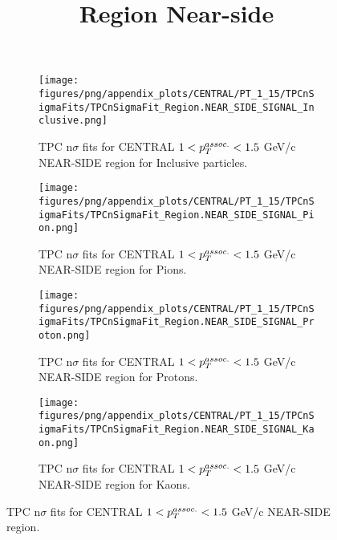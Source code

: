             \begin{figure}[H]
                \title{Region Near-side}
                \begin{subfigure}[b]{0.5\textwidth}
                    \centering
                    \texttt{[image: figures/png/appendix\_plots/CENTRAL/PT\_1\_15/TPCnSigmaFits/TPCnSigmaFit\_Region.NEAR\_SIDE\_SIGNAL\_Inclusive.png]}
                    \caption{TPC n$\sigma$ fits for CENTRAL $1 < \pTassoc < 1.5$ GeV/c NEAR-SIDE region for Inclusive particles.}
                    \label{fig:appendix_CENTRAL_$1 < \pTassoc < 1.5$ GeV/c_NEAR_SIDE_SIGNAL_Inclusive}
                \end{subfigure}
                \begin{subfigure}[b]{0.5\textwidth}
                    \centering
                    \texttt{[image: figures/png/appendix\_plots/CENTRAL/PT\_1\_15/TPCnSigmaFits/TPCnSigmaFit\_Region.NEAR\_SIDE\_SIGNAL\_Pion.png]}
                    \caption{TPC n$\sigma$ fits for CENTRAL $1 < \pTassoc < 1.5$ GeV/c NEAR-SIDE region for Pions.}
                    \label{fig:appendix_CENTRAL_$1 < \pTassoc < 1.5$ GeV/c_NEAR_SIDE_SIGNAL_Pion}
                \end{subfigure}
                \begin{subfigure}[b]{0.5\textwidth}
                    \centering
                    \texttt{[image: figures/png/appendix\_plots/CENTRAL/PT\_1\_15/TPCnSigmaFits/TPCnSigmaFit\_Region.NEAR\_SIDE\_SIGNAL\_Proton.png]}
                    \caption{TPC n$\sigma$ fits for CENTRAL $1 < \pTassoc < 1.5$ GeV/c NEAR-SIDE region for Protons.}
                    \label{fig:appendix_CENTRAL_$1 < \pTassoc < 1.5$ GeV/c_NEAR_SIDE_SIGNAL_Proton}
                \end{subfigure}
                \begin{subfigure}[b]{0.5\textwidth}
                    \centering
                    \texttt{[image: figures/png/appendix\_plots/CENTRAL/PT\_1\_15/TPCnSigmaFits/TPCnSigmaFit\_Region.NEAR\_SIDE\_SIGNAL\_Kaon.png]}
                    \caption{TPC n$\sigma$ fits for CENTRAL $1 < \pTassoc < 1.5$ GeV/c NEAR-SIDE region for Kaons.}
                    \label{fig:appendix_CENTRAL_$1 < \pTassoc < 1.5$ GeV/c_NEAR_SIDE_SIGNAL_Kaon}
                \end{subfigure}
                \caption{TPC n$\sigma$ fits for CENTRAL $1 < \pTassoc < 1.5$ GeV/c NEAR-SIDE region.}
                \label{fig:appendix_CENTRAL_$1 < \pTassoc < 1.5$ GeV/c_NEAR_SIDE_SIGNAL}
            \end{figure}
